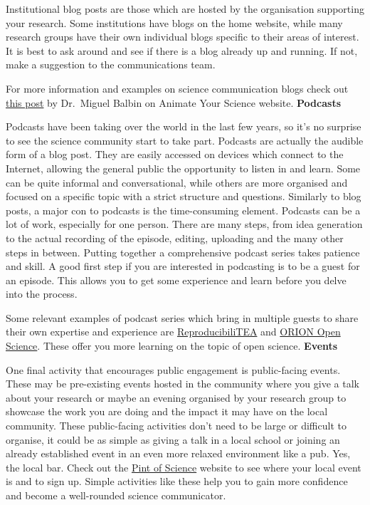 \documentclass[
]{book}
\begin{document}
Institutional blog posts are those which are hosted by the organisation supporting your research. Some institutions have blogs on the home website, while many research groups have their own individual blogs specific to their areas of interest. It is best to ask around and see if there is a blog already up and running. If not, make a suggestion to the communications team.

For more information and examples on science communication blogs check out \href{https://www.animateyour.science/post/top-5-science-communication-blogs}{this post} by Dr.~Miguel Balbin on Animate Your Science website. \textbf{Podcasts}

Podcasts have been taking over the world in the last few years, so it's no surprise to see the science community start to take part. Podcasts are actually the audible form of a blog post. They are easily accessed on devices which connect to the Internet, allowing the general public the opportunity to listen in and learn. Some can be quite informal and conversational, while others are more organised and focused on a specific topic with a strict structure and questions. Similarly to blog posts, a major con to podcasts is the time-consuming element. Podcasts can be a lot of work, especially for one person. There are many steps, from idea generation to the actual recording of the episode, editing, uploading and the many other steps in between. Putting together a comprehensive podcast series takes patience and skill. A good first step if you are interested in podcasting is to be a guest for an episode. This allows you to get some experience and learn before you delve into the process.

Some relevant examples of podcast series which bring in multiple guests to share their own expertise and experience are \href{https://soundcloud.com/reproducibilitea}{ReproducibiliTEA} and \href{https://www.orion-openscience.eu/publications/training-materials/201902/podcasts}{ORION Open Science}. These offer you more learning on the topic of open science. \textbf{Events}

One final activity that encourages public engagement is public-facing events. These may be pre-existing events hosted in the community where you give a talk about your research or maybe an evening organised by your research group to showcase the work you are doing and the impact it may have on the local community. These public-facing activities don't need to be large or difficult to organise, it could be as simple as giving a talk in a local school or joining an already established event in an even more relaxed environment like a pub. Yes, the local bar. Check out the \href{https://pintofscience.com/}{Pint of Science} website to see where your local event is and to sign up. Simple activities like these help you to gain more confidence and become a well-rounded science communicator.
\end{document}
